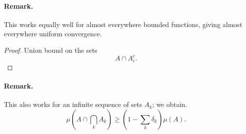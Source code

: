 \paragraph{Remark.} This works equally well for almost everywhere bounded functions, giving almost everywhere uniform convergence.

\begin{proof}
    Union bound on the sets
    \[
        A \cap A_i^c.
    \]
\end{proof}

\paragraph{Remark.} This also works for an infinite sequence of sets \( A_k \); we obtain.
\[ 
    \mu \left( A \cap \bigcap_k A_k \right) \geqslant \left( 1 - \sum_k \delta_k \right)\mu(A). 
\]
